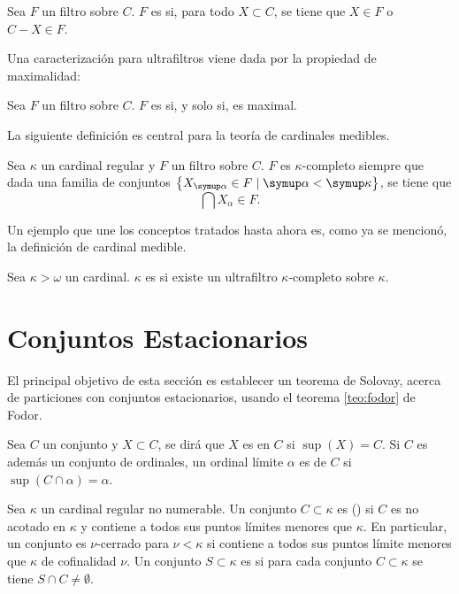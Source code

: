 \begin{defi}
    Sea $F$ un filtro sobre $C$. $F$ es  si, para todo $X\subset C$,
    se tiene que $X\in F$ o $C-X\in F$.
\end{defi}

Una caracterización para ultrafiltros viene dada por la propiedad
de maximalidad:

\begin{teo}
    Sea $F$ un filtro sobre $C$. $F$ es  si, y solo si, es maximal.
\end{teo}

La siguiente definición es central para la teoría de cardinales medibles.

\begin{defi}
    Sea $\kappa$ un cardinal regular y $F$ un filtro sobre $C$.
    $F$ es $\kappa$-completo siempre que dada una familia de conjuntos
    $\set{X_\alpha\in F\mid \alpha<\kappa}$,
    se tiene que
    \[
        \bigcap X_\alpha \in F.
    \]
\end{defi}

Un ejemplo que une los conceptos tratados hasta ahora es, como ya se mencionó,
la definición de cardinal medible.

\begin{defi}
    Sea $\kappa > \omega$ un cardinal. $\kappa$ es  si existe
    un ultrafiltro $\kappa\text{-completo}$ sobre $\kappa$.
\end{defi}

\section{Conjuntos Estacionarios}

El principal objetivo de esta sección es establecer un teorema
de Solovay, acerca de particiones
con conjuntos estacionarios, usando el teorema \ref{teo:fodor}
de Fodor.

Sea $C$ un conjunto y $X\subset C$, se dirá que $X$ es 
en $C$ si $\sup(X) = C$.
Si $C$ es además un conjunto de ordinales, un ordinal límite $\alpha$ es
 de $C$ si $\sup ( C \cap\alpha ) = \alpha$.
\begin{defi}
    Sea $\kappa$ un cardinal regular no numerable. Un conjunto $C\subset \kappa$
    es  (\cna) si $C$ es no acotado en $\kappa$ y contiene a
    todos sus puntos límites menores que $\kappa$. En particular, un conjunto es $\nu$-cerrado
    para $\nu<\kappa$ si contiene a todos sus puntos límite menores que $\kappa$ de cofinalidad $\nu$.
    Un conjunto $S\subset\kappa$ es  si para cada conjunto
    \cna{} $C\subset\kappa$ se tiene $S\cap C\neq\emptyset$.
\end{defi}

